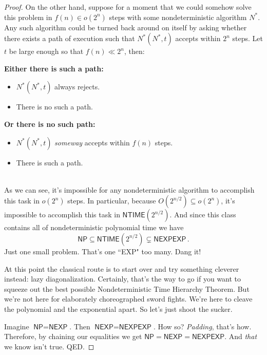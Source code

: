 \documentclass{article}
\newcommand{\nameditem}[1]{\item\textbf{#1}}
\newcommand{\impl}{\item[$\Rightarrow$]}
\newcommand{\NTIME}{\ensuremath{\textsf{NTIME}}}
\newcommand{\NP}{\ensuremath{\textsf{NP}}}
\newcommand{\NEXP}{\ensuremath{\textsf{NEXP}}}
\newcommand{\NEXPEXP}{\ensuremath{\textsf{NEXPEXP}}}
\begin{document}
\begin{proof}
On the other hand, suppose for a moment that we could somehow solve this problem in $f(n) \in o(2^n)$ steps with some nondeterministic algorithm $N^*$. Any such algorithm could be turned back around on itself by asking whether there exists a path of execution such that $N^*(N^*, t)$ accepts within $2^n$ steps. Let $t$ be large enough so that $f(n) \ll 2^n$, then:\\[0.5em]
\begin{minipage}{0.5\textwidth}
\begin{description}[noitemsep]
\nameditem{Either there is such a path:} 
\begin{itemize}[noitemsep]
\impl $N^*(N^*, t)$ always rejects.
\impl There is no such a path. \lightning
\end{itemize}
\end{description}
\end{minipage}
\begin{minipage}{0.5\textwidth}
\begin{description}[noitemsep]
\nameditem{Or there is no such path:} 
\begin{itemize}[noitemsep]
\impl $N^*(N^*, t)$ \textit{someway} accepts within $f(n)$ steps.
\impl There is such a path. \lightning
\end{itemize}
\end{description}
\end{minipage}\\[1em]
As we can see, it's impossible for any nondeterministic algorithm to accomplish this task in $o(2^n)$ steps. In particular, because $O\left(2^{n/2}\right) \subseteq o(2^n)$, it's impossible to accomplish this task in $\NTIME\left(2^{n/2}\right)$. And since this class contains all of nondeterministic polynomial time we have
\[
\NP \subseteq \NTIME\left(2^{n/2}\right) \subsetneq \NEXPEXP\,.
\]
Just one small problem. That's one ``\textsf{EXP}" too many. Dang it!

At this point the classical route is to start over and try something cleverer instead: lazy diagonalization.\cite{stanislav} Certainly, that's the way to go if you want to squeeze out the best possible Nondeterministic Time Hierarchy Theorem. But we're not here for elaborately choreographed sword fights. We're here to cleave the polynomial and the exponential apart. So let's just shoot the sucker.

Imagine $\NP = \NEXP$. Then $\NEXP = \NEXPEXP$. How so? \textit{Padding}, that's how. Therefore, by chaining our equalities we get $\NP = \NEXP = \NEXPEXP$. And \textit{that} we know isn't true. QED.


\end{proof}
\end{document}
